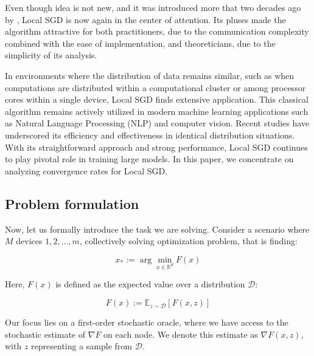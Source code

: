 \vspace{10pt}

Even though idea is not new, and it was introduced more that two decades ago by \cite{Mangasarian}, Local SGD is now again in the center of attention.
Its pluses made the algorithm attractive for both practitioners, due to the communication complexity combined with the ease of implementation, and theoreticians, due to the simplicity of its analysis. 

\vspace{10pt}

In environments where the distribution of data remains similar, such as when computations are distributed within a computational cluster or among processor cores within a single device, Local SGD finds extensive application. This classical algorithm remains actively utilized in modern machine learning applications such as Natural Language Processing (NLP) and computer vision. Recent studies \citep{LocalSGD_CV, LocalSGD_LLM} have underscored its efficiency and effectiveness in identical distribution situations. With its straightforward approach and strong performance, Local SGD continues to play pivotal role in training large models. In this paper, we concentrate on analyzing convergence rates for Local SGD.

\vspace{10pt}

\subsection{Problem formulation} \label{subsec:problem_formulation}

Now, let us formally introduce the task we are solving. Consider a scenario where \( M \) devices \( 1, 2, \ldots, m \), collectively solving optimization problem, that is finding:

\[ x_* := \arg\min_{x \in \mathbb{R}^d} F(x) \]

Here, \( F(x) \) is defined as the expected value over a distribution \( \mathcal{D} \):

\[ F(x) := \mathbb{E}_{z \sim \mathcal{D}} [F(x, z)] \]


Our focus lies on a first-order stochastic oracle, where we have access to the stochastic estimate of \( \nabla F \) on each node. We denote this estimate as \( \nabla F(x, z) \), with \( z \) representing a sample from \( \mathcal{D} \).

